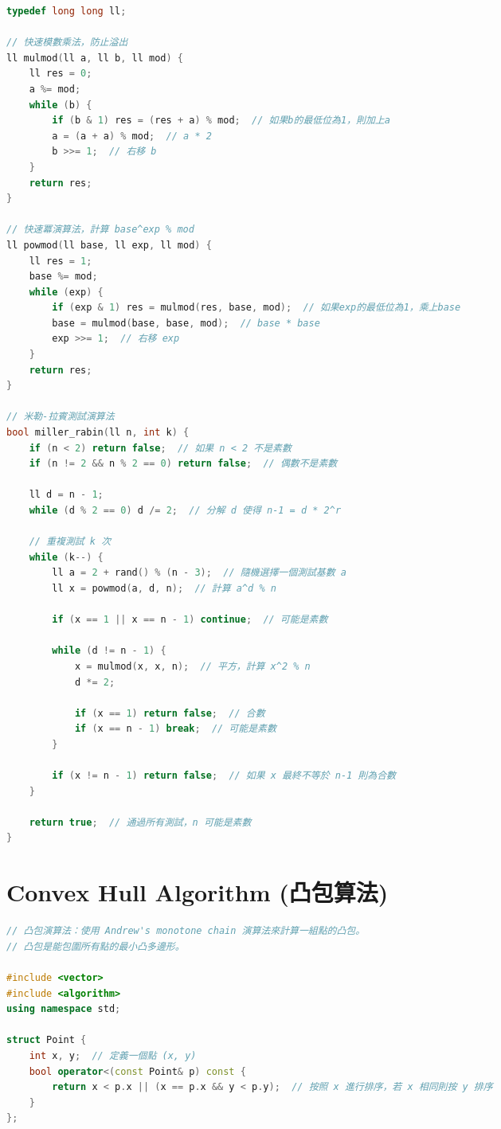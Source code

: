 \documentclass{article}
\begin{document}
\begin{multicols}{2}
\begin{lstlisting}[language=C++]
typedef long long ll;

// 快速模數乘法，防止溢出
ll mulmod(ll a, ll b, ll mod) {
    ll res = 0;
    a %= mod;
    while (b) {
        if (b & 1) res = (res + a) % mod;  // 如果b的最低位為1，則加上a
        a = (a + a) % mod;  // a * 2
        b >>= 1;  // 右移 b
    }
    return res;
}

// 快速冪演算法，計算 base^exp % mod
ll powmod(ll base, ll exp, ll mod) {
    ll res = 1;
    base %= mod;
    while (exp) {
        if (exp & 1) res = mulmod(res, base, mod);  // 如果exp的最低位為1，乘上base
        base = mulmod(base, base, mod);  // base * base
        exp >>= 1;  // 右移 exp
    }
    return res;
}

// 米勒-拉賓測試演算法
bool miller_rabin(ll n, int k) {
    if (n < 2) return false;  // 如果 n < 2 不是素數
    if (n != 2 && n % 2 == 0) return false;  // 偶數不是素數

    ll d = n - 1;
    while (d % 2 == 0) d /= 2;  // 分解 d 使得 n-1 = d * 2^r

    // 重複測試 k 次
    while (k--) {
        ll a = 2 + rand() % (n - 3);  // 隨機選擇一個測試基數 a
        ll x = powmod(a, d, n);  // 計算 a^d % n

        if (x == 1 || x == n - 1) continue;  // 可能是素數

        while (d != n - 1) {
            x = mulmod(x, x, n);  // 平方，計算 x^2 % n
            d *= 2;

            if (x == 1) return false;  // 合數
            if (x == n - 1) break;  // 可能是素數
        }

        if (x != n - 1) return false;  // 如果 x 最終不等於 n-1 則為合數
    }

    return true;  // 通過所有測試，n 可能是素數
}
\end{lstlisting}

\section{Convex Hull Algorithm (凸包算法)}

\begin{lstlisting}[language=C++]
// 凸包演算法：使用 Andrew's monotone chain 演算法來計算一組點的凸包。
// 凸包是能包圍所有點的最小凸多邊形。

#include <vector>
#include <algorithm>
using namespace std;

struct Point {
    int x, y;  // 定義一個點 (x, y)
    bool operator<(const Point& p) const {
        return x < p.x || (x == p.x && y < p.y);  // 按照 x 進行排序，若 x 相同則按 y 排序
    }
};


\end{lstlisting}
\end{multicols}
\end{document}
